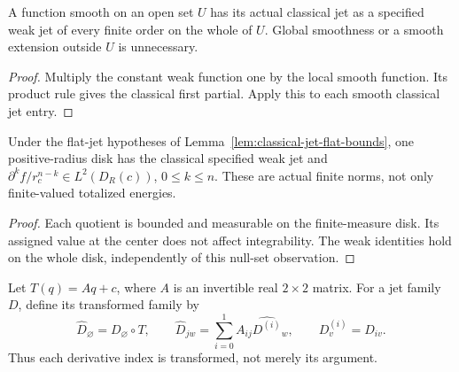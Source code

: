 \begin{lemma}
\label{lem:local-classical-weak-jet}
\leanok
A function smooth on an open set $U$ has its actual classical jet as a
specified weak jet of every finite order on the whole of $U$.
Global smoothness or a smooth extension outside $U$ is unnecessary.
\end{lemma}

\begin{proof}
\leanok
Multiply the constant weak function one by the local smooth function.
Its product rule gives the classical first partial.
Apply this to each smooth classical jet entry.
\end{proof}

\begin{lemma}
\label{lem:flat-jet-radial-mass}
\leanok
Under the flat-jet hypotheses of Lemma~\ref{lem:classical-jet-flat-bounds},
one positive-radius disk has the classical specified weak jet and
$\partial^k f/r_c^{n-k}\in L^2(D_R(c))$, $0\le k\le n$.
These are actual finite norms, not only finite-valued totalized energies.
\end{lemma}

\begin{proof}
\leanok
Each quotient is bounded and measurable on the finite-measure disk.
Its assigned value at the center does not affect integrability.
The weak identities hold on the whole disk, independently of this null-set
observation.
\end{proof}

\begin{definition}
\label{def:affine-jet}
\leanok
Let $T(q)=Aq+c$, where $A$ is an invertible real $2\times2$ matrix.
For a jet family $D$, define its transformed family by
\[
 \widehat D_{\varnothing}=D_{\varnothing}\circ T,\qquad
 \widehat D_{jw}=\sum_{i=0}^1 A_{ij}\widehat{D^{(i)}}_w,
 \qquad D^{(i)}_v=D_{iv}.
\]
Thus each derivative index is transformed, not merely its argument.
\end{definition}

